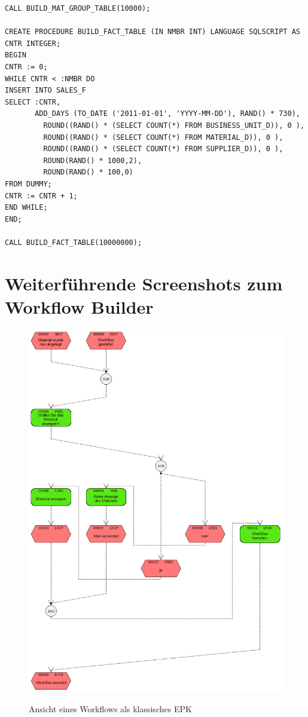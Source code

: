 \begin{lstlisting}
CALL BUILD_MAT_GROUP_TABLE(10000);
 
CREATE PROCEDURE BUILD_FACT_TABLE (IN NMBR INT) LANGUAGE SQLSCRIPT AS
CNTR INTEGER;
BEGIN
CNTR := 0;
WHILE CNTR < :NMBR DO
INSERT INTO SALES_F
SELECT :CNTR,
       ADD_DAYS (TO_DATE ('2011-01-01', 'YYYY-MM-DD'), RAND() * 730),
         ROUND((RAND() * (SELECT COUNT(*) FROM BUSINESS_UNIT_D)), 0 ),
         ROUND((RAND() * (SELECT COUNT(*) FROM MATERIAL_D)), 0 ),
         ROUND((RAND() * (SELECT COUNT(*) FROM SUPPLIER_D)), 0 ),
         ROUND(RAND() * 1000,2),
         ROUND(RAND() * 100,0)
FROM DUMMY;      
CNTR := CNTR + 1;
END WHILE;
END;
 
CALL BUILD_FACT_TABLE(10000000);
\end{lstlisting}

\section{Weiterführende Screenshots zum Workflow Builder}

\begin{figure}[H]
	\begin{center}
	\includegraphics[height=0.9\textheight]{grafiken/wf-builder_view-classicepc.png}
	\caption{Ansicht eines Workflows als klassisches EPK}
	\vspace{-10pt}
	\label{abb:workflow-view-classicepc}
	\end{center}
\end{figure}

